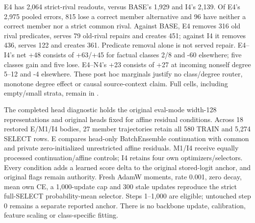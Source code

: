 E4 has 2,064 strict-rival readouts, versus BASE's 1,929 and I4's 2,139. Of E4's 2,975 pooled errors, 815 lose a correct member alternative and 96 have neither a correct member nor a strict common rival. Against BASE, E4 removes 316 old rival predicates, serves 79 old-rival repairs and creates 451; against I4 it removes 436, serves 122 and creates 361. Predicate removal alone is not served repair. E4--I4's net +48 consists of +63/+45 for factual classes 2/8 and -60 elsewhere; five classes gain and five lose. E4--N4's +23 consists of +27 at incoming nonself degree 5--12 and -4 elsewhere. These post hoc marginals justify no class/degree router, monotone degree effect or causal source-context claim. Full cells, including empty/small strata, remain in .

The completed head diagnostic holds the original eval-mode width-128 representations and original heads fixed for affine residual conditions. Across 18 restored E/M1/I4 bodies, 27 member trajectories retain all 580 TRAIN and 5,274 SELECT rows. E compares head-only BatchEnsemble continuation with common and private zero-initialized unrestricted affine residuals. M1/I4 receive equally processed continuation/affine controls; I4 retains four own optimizers/selectors. Every condition adds a learned score delta to the original stored-logit anchor, and original flags remain authority. Fresh AdamW moments, rate 0.001, zero decay, mean own CE, a 1,000-update cap and 300 stale updates reproduce the strict full-SELECT probability-mean selector. Steps 1--1,000 are eligible; untouched step 0 remains a separate reported anchor. There is no backbone update, calibration, feature scaling or class-specific fitting.

